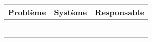 \begin{tabularx}{\linewidth}{
    |>{\hsize=2.0\hsize}X|%
    >{\hsize=0.5\hsize}X|%
    >{\hsize=0.5\hsize}X|%
  }
    \hline
    Problème & Système & Responsable \\\hline
      &   &   \\\hline
      &   &   \\\hline
      &   &   \\\hline
      &   &   \\\hline
      &   &   \\\hline
      &   &   \\\hline
  \end{tabularx}
     